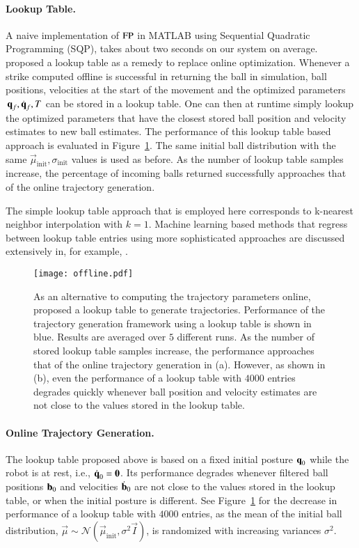 \paragraph{\textbf{Lookup Table}.} A naive implementation of $\mathrm{FP}$ in MATLAB using Sequential Quadratic Programming (SQP), takes about two seconds on our system on average. \citet{Koc16} proposed a lookup table as a remedy to replace online optimization. Whenever a strike computed offline is successful in returning the ball in simulation, ball positions, velocities at the start of the movement and the optimized parameters $\, \boldsymbol{\mathrm{q}}_f, \dot{\boldsymbol{\mathrm{q}}}_f, T$ can be stored in a lookup table. One can then at runtime simply lookup the optimized parameters that have the closest stored ball position and velocity estimates to new ball estimates. The performance of this lookup table based approach is evaluated in Figure~\ref{fig:offline}. The same initial ball distribution with the same $\vec{\mu}_{\mathrm{init}}, \sigma_{\mathrm{init}}$ values is used as before. As the number of lookup table samples increase, the percentage of incoming balls returned successfully approaches that of the online trajectory generation. 

The simple lookup table approach that is employed here corresponds to k-nearest neighbor interpolation with $k = 1$. Machine learning based methods that regress between lookup table entries using more sophisticated approaches are discussed extensively in, for example, \citet{Lampariello11}.

\begin{figure}[t!]
\centering
\texttt{[image: offline.pdf]}	
\caption{As an alternative to computing the trajectory parameters online, \citet{Koc16} proposed a lookup table to generate trajectories. Performance of the trajectory generation framework using a lookup table is shown in blue. Results are averaged over $5$ different runs. As the number of stored lookup table samples increase, the performance approaches that of the online trajectory generation in (a). However, as shown in (b), even the performance of a lookup table with $4000$ entries degrades quickly whenever ball position and velocity estimates are not close to the values stored in the lookup table. }
\label{fig:offline}
\end{figure}

\paragraph{\textbf{Online Trajectory Generation}.} The lookup table proposed above is based on a fixed initial posture $\boldsymbol{\mathrm{q}}_{0}$ while the robot is at rest, i.e., $\dot{\boldsymbol{\mathrm{q}}}_0 = \boldsymbol{\mathrm{0}}$. Its performance degrades whenever filtered ball positions $\boldsymbol{\mathrm{b}}_0$ and velocities $\dot{\boldsymbol{\mathrm{b}}}_0$ are not close to the values stored in the lookup table, or when the initial posture is different. See Figure~\ref{fig:offline} for the decrease in performance of a lookup table with $4000$ entries, as the mean of the initial ball distribution, $\vec{\mu} \sim \mathcal{N}(\vec{\mu}_{\mathrm{init}},\sigma^{2}\vec{I})$, is randomized with increasing variances $\sigma^{2}$. %

